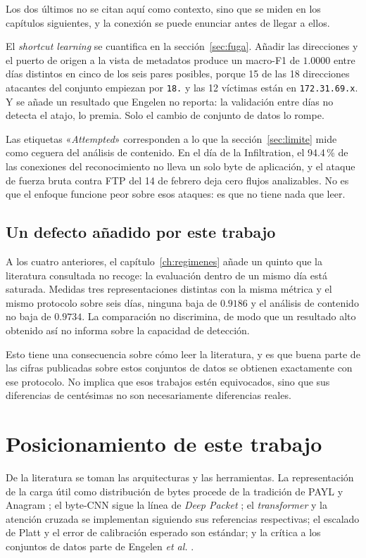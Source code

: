 Los dos últimos no se citan aquí como contexto, sino que se miden en los
capítulos siguientes, y la conexión se puede enunciar antes de llegar a ellos.

El \emph{shortcut learning} se cuantifica en la sección~\ref{sec:fuga}. Añadir
las direcciones y el puerto de origen a la vista de metadatos produce un macro-F1
de $1.0000$ entre días distintos en cinco de los seis pares posibles, porque 15
de las 18 direcciones atacantes del conjunto empiezan por \texttt{18.} y las 12
víctimas están en \texttt{172.31.69.x}. Y se añade un resultado que Engelen no
reporta: la validación entre días no detecta el atajo, lo premia. Solo el cambio
de conjunto de datos lo rompe.

Las etiquetas «\emph{Attempted}» corresponden a lo que la
sección~\ref{sec:limite} mide como ceguera del análisis de contenido. En el día
de la Infiltration, el 94.4\,\% de las conexiones del reconocimiento no lleva un
solo byte de aplicación, y el ataque de fuerza bruta contra FTP del 14 de febrero
deja cero flujos analizables. No es que el enfoque funcione peor sobre esos
ataques: es que no tiene nada que leer.

\subsection*{Un defecto añadido por este trabajo}

A los cuatro anteriores, el capítulo~\ref{ch:regimenes} añade un quinto que la
literatura consultada no recoge: la evaluación dentro de un mismo día está
saturada. Medidas tres representaciones distintas con la misma métrica y el mismo
protocolo sobre seis días, ninguna baja de $0.9186$ y el análisis de contenido
no baja de $0.9734$. La comparación no discrimina, de modo que un resultado
alto obtenido así no informa sobre la capacidad de detección.

Esto tiene una consecuencia sobre cómo leer la literatura, y es que buena parte
de las cifras publicadas sobre estos conjuntos de datos se obtienen exactamente
con ese protocolo. No implica que esos trabajos estén equivocados, sino que sus
diferencias de centésimas no son necesariamente diferencias reales.

\section{Posicionamiento de este trabajo}
\label{sec:sota-posicionamiento}

De la literatura se toman las arquitecturas y las herramientas. La
representación de la carga útil como distribución de bytes procede de la
tradición de PAYL y Anagram \cite{Wang2004, Wang2006}; el byte-CNN sigue la línea
de \emph{Deep Packet} \cite{Lotfollahi2020}; el \emph{transformer} y la atención
cruzada se implementan siguiendo sus referencias respectivas; el escalado de
Platt \cite{Platt1999} y el error de calibración esperado \cite{Guo2017} son
estándar; y la crítica a los conjuntos de datos parte de Engelen \emph{et al.}
\cite{Engelen2021}.

